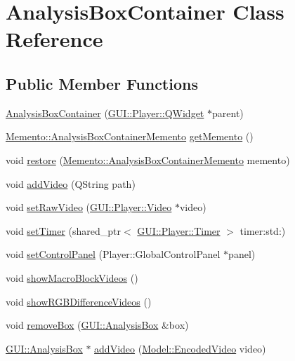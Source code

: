 \hypertarget{classGUI_1_1AnalysisBoxContainer}{}\section{Analysis\+Box\+Container Class Reference}
\label{classGUI_1_1AnalysisBoxContainer}
\subsection*{Public Member Functions}
\begin{DoxyCompactItemize}
\item 
\hyperlink{classGUI_1_1AnalysisBoxContainer_a9aa66993362512fd55086aac21506543}{Analysis\+Box\+Container} (\hyperlink{classGUI_1_1Player_1_1QWidget}{G\+U\+I\+::\+Player\+::\+Q\+Widget} $\ast$parent)
\item 
\hyperlink{classMemento_1_1AnalysisBoxContainerMemento}{Memento\+::\+Analysis\+Box\+Container\+Memento} \hyperlink{classGUI_1_1AnalysisBoxContainer_a0743a7c422123fbd5d22a946af5092ca}{get\+Memento} ()
\item 
void \hyperlink{classGUI_1_1AnalysisBoxContainer_af6d8c35bc3f7000da0579310af42e756}{restore} (\hyperlink{classMemento_1_1AnalysisBoxContainerMemento}{Memento\+::\+Analysis\+Box\+Container\+Memento} memento)
\item 
void \hyperlink{classGUI_1_1AnalysisBoxContainer_af3b761e148d9cb7352c5ffb4bf4c66bd}{add\+Video} (Q\+String path)
\item 
void \hyperlink{classGUI_1_1AnalysisBoxContainer_ae45e621cb87a85ffb069ac765a306711}{set\+Raw\+Video} (\hyperlink{classGUI_1_1Player_1_1Video}{G\+U\+I\+::\+Player\+::\+Video} $\ast$video)
\item 
void \hyperlink{classGUI_1_1AnalysisBoxContainer_a0a63304dda40cabeda44acd79bb08b59}{set\+Timer} (shared\+\_\+ptr$<$ \hyperlink{classGUI_1_1Player_1_1Timer}{G\+U\+I\+::\+Player\+::\+Timer} $>$ timer\+:std\+:)
\item 
void \hyperlink{classGUI_1_1AnalysisBoxContainer_a9c1b482d1dcd6a733b84a9cdcc960263}{set\+Control\+Panel} (Player\+::\+Global\+Control\+Panel $\ast$panel)
\item 
void \hyperlink{classGUI_1_1AnalysisBoxContainer_ab3d9dc42d8e78c5bf6f87c5e93bdf1ce}{show\+Macro\+Block\+Videos} ()
\item 
void \hyperlink{classGUI_1_1AnalysisBoxContainer_a91638333a4b3fe577fd2062f2aa667f3}{show\+R\+G\+B\+Difference\+Videos} ()
\item 
void \hyperlink{classGUI_1_1AnalysisBoxContainer_a181a2114e38722fcae5a9c1d5b1d0ff7}{remove\+Box} (\hyperlink{classGUI_1_1AnalysisBox}{G\+U\+I\+::\+Analysis\+Box} \&box)
\item 
\hyperlink{classGUI_1_1AnalysisBox}{G\+U\+I\+::\+Analysis\+Box} $\ast$ \hyperlink{classGUI_1_1AnalysisBoxContainer_a483776769a5f7b2913128aa76251026b}{add\+Video} (\hyperlink{classModel_1_1EncodedVideo}{Model\+::\+Encoded\+Video} video)
\end{DoxyCompactItemize}
